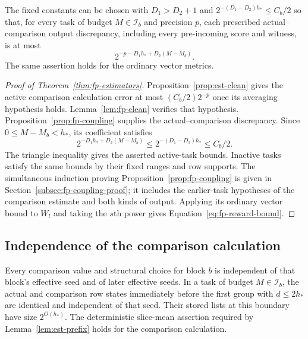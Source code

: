 \begin{proposition}\label{prop:fp-coupling}
The fixed constants can be chosen with $D_1>D_2+1$ and
$2^{-(D_1-D_2)h_*}\le C_b/2$ so that, for every task of budget
$M\in\mathcal I_b$ and precision $p$, each prescribed actual--comparison
output discrepancy, including every pre-incoming score and witness,
is at most
\[
 2^{-p-D_1h_*+D_2(M-M_b)}.
\]
The same assertion holds for the ordinary vector metrics.
\end{proposition}

\begin{proof}[Proof of Theorem~\ref{thm:fp-estimators}]
Proposition~\ref{prop:est-clean} gives the active comparison calculation
error at most $(C_b/2)2^{-p}$ once its averaging hypothesis holds.
Lemma~\ref{lem:fp-clean} verifies that hypothesis.
Proposition~\ref{prop:fp-coupling} supplies the actual--comparison discrepancy.
Since $0\le M-M_b<h_*$, its coefficient satisfies
\[
 2^{-D_1h_*+D_2(M-M_b)}\le2^{-(D_1-D_2)h_*}\le C_b/2.
\]
The triangle inequality gives the asserted active-task bounds. Inactive
tasks satisfy the same bounds by their fixed ranges and row supports.
The simultaneous induction proving Proposition~\ref{prop:fp-coupling}
is given in Section~\ref{subsec:fp-coupling-proof}; it includes the
earlier-task hypotheses of the comparison estimate and both kinds of output.
Applying its ordinary vector bound to $W_l$ and taking the $s$th power
gives Equation~\eqref{eq:fp-reward-bound}.
\end{proof}

\subsection{Independence of the comparison calculation}

\begin{lemma}\label{lem:fp-clean}
Every comparison value and structural choice for block $b$ is independent of
that block's effective seed and of later effective seeds.  In a task of
budget $M\in\mathcal I_b$, the actual and comparison row states immediately before
the first group with $d\le2h_*$ are identical and independent of that
seed.  Their stored lists at this boundary have size $2^{O(h_*)}$.
The deterministic slice-mean assertion required by
Lemma~\ref{lem:est-prefix} holds for the comparison calculation.
\end{lemma}

